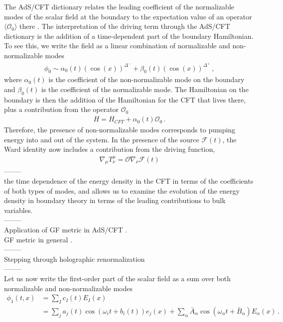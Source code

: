 \documentclass[letterpaper,11pt]{article}
\newcommand{\oi}{\omega_i}
\newcommand{\mc}{\mathcal}
\begin{document}
The AdS/CFT dictionary relates the leading coefficient of the normalizable modes 
of the scalar field at the boundary to the expectation value of an operator $\langle \mc O_0 \rangle$ there \cite{hep-th/9808017}.
The interpretation of the driving term through the AdS/CFT dictionary is the addition of a 
time-dependent part of the boundary Hamiltonian. To see this, we write the field as a linear combination of normalizable and
non-normalizable modes 
\begin{align}
	\phi_0 \sim \alpha_0 (t) \left(\cos (x)\right)^{\Delta^-} + \beta_0 (t) \left( \cos (x) \right)^{\Delta^+} \, ,
\end{align}
where $\alpha_0(t)$ is the coefficient of the non-normalizable mode on the boundary and $\beta_0 (t)$ is the 
coefficient of the normalizable mode. The Hamiltonian on the boundary is then the addition of the Hamiltonian
for the CFT that lives there, plus a contribution from the operator $\mc O_0$
\begin{align}
	H = H_{CFT} + \alpha_0(t) \mc O_0 \, .
\end{align}
Therefore, the presence of non-normalizable modes corresponds to pumping energy into and out of the system. In the presence of the 
source $\mc F(t)$, the Ward identity now includes a contribution from the driving function,
\begin{align}
	\nabla_\mu T^\mu_\nu = \mc O \nabla_\nu \mc F(t)
\end{align} 
-------- \\
the time dependence of the 
energy density in the CFT in terms of the coefficients of both types of modes, and allows us to examine 
the evolution of the energy density in boundary theory in terms of the leading contributions to bulk 
variables. \\
-------- \\
Application of GF metric in AdS/CFT \cite{0707.1737, hep-th/0303164, hep-th/0205075}. \\
GF metric in general \cite{fefferman1985mathematical}. \\
-------- \\
Stepping through holographic renormalization \cite{hep-th/0112119, hep-th/0205061} \\
-------- \\
Let us now write the first-order part of the scalar field as a sum over both normalizable 
and non-normalizable modes
\begin{align}
\label{phi1 gen}
\phi_1(t,x) &= \sum_I c_I (t)  E_I (x) \nonumber \\
&= \sum_j a_j (t) \cos \left( \oi t + b_i(t) \right) e_j(x) + \sum_\alpha \bar A_\alpha \cos \left( \omega_\alpha t + \bar{B}_\alpha \right) E_\alpha(x) \, .
\end{align}
\end{document}
